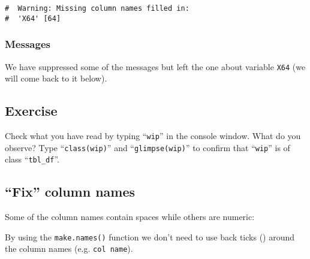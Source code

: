 \documentclass[a4paper,9pt,twocolumn,twoside,printwatermark=false]{pinp}
\begin{document}
\begin{ShadedResult}
\begin{verbatim}
#  Warning: Missing column names filled in:
#  'X64' [64]
\end{verbatim}
\end{ShadedResult}

\hypertarget{messages}{%
\subsubsection{Messages}\label{messages}}

We have suppressed some of the messages but left the one about variable
\texttt{X64} (we will come back to it below).

\hypertarget{exercise-1}{%
\subsection{Exercise}\label{exercise-1}}

Check what you have read by typing ``\texttt{wip}'' in the console
window. What do you observe? Type ``\texttt{class(wip)}'' and
``\texttt{glimpse(wip)}'' to confirm that ``\texttt{wip}'' is of class
``\texttt{tbl\_df}''.

\hypertarget{fix-column-names}{%
\subsection{``Fix'' column names}\label{fix-column-names}}

Some of the column names contain spaces while others are numeric:

\begin{Shaded}
\begin{Highlighting}[]
\NormalTok{(}
\NormalTok{(}
\end{Highlighting}
\end{Shaded}

By using the \texttt{make.names()} function we don't need to use back
ticks (\texttt{\textasciigrave{}}) around the column names (e.g.
\texttt{\textasciigrave{}col\ name\textasciigrave{}}).

\begin{Shaded}
\begin{Highlighting}[]
\StringTok{ }\NormalTok{(}
\NormalTok{(}
\NormalTok{(}
\end{Highlighting}
\end{Shaded}
\end{document}
